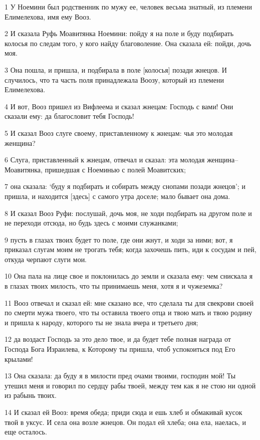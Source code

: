 \par 1 У Ноемини был родственник по мужу ее, человек весьма знатный, из племени Елимелехова, имя ему Вооз.
\par 2 И сказала Руфь Моавитянка Ноемини: пойду я на поле и буду подбирать колосья по следам того, у кого найду благоволение. Она сказала ей: пойди, дочь моя.
\par 3 Она пошла, и пришла, и подбирала в поле [колосья] позади жнецов. И случилось, что та часть поля принадлежала Воозу, который из племени Елимелехова.
\par 4 И вот, Вооз пришел из Вифлеема и сказал жнецам: Господь с вами! Они сказали ему: да благословит тебя Господь!
\par 5 И сказал Вооз слуге своему, приставленному к жнецам: чья это молодая женщина?
\par 6 Слуга, приставленный к жнецам, отвечал и сказал: эта молодая женщина--Моавитянка, пришедшая с Ноеминью с полей Моавитских;
\par 7 она сказала: `буду я подбирать и собирать между снопами позади жнецов'; и пришла, и находится [здесь] с самого утра доселе; мало бывает она дома.
\par 8 И сказал Вооз Руфи: послушай, дочь моя, не ходи подбирать на другом поле и не переходи отсюда, но будь здесь с моими служанками;
\par 9 пусть в глазах твоих будет то поле, где они жнут, и ходи за ними; вот, я приказал слугам моим не трогать тебя; когда захочешь пить, иди к сосудам и пей, откуда черпают слуги мои.
\par 10 Она пала на лице свое и поклонилась до земли и сказала ему: чем снискала я в глазах твоих милость, что ты принимаешь меня, хотя я и чужеземка?
\par 11 Вооз отвечал и сказал ей: мне сказано все, что сделала ты для свекрови своей по смерти мужа твоего, что ты оставила твоего отца и твою мать и твою родину и пришла к народу, которого ты не знала вчера и третьего дня;
\par 12 да воздаст Господь за это дело твое, и да будет тебе полная награда от Господа Бога Израилева, к Которому ты пришла, чтоб успокоиться под Его крылами!
\par 13 Она сказала: да буду я в милости пред очами твоими, господин мой! Ты утешил меня и говорил по сердцу рабы твоей, между тем как я не стою ни одной из рабынь твоих.
\par 14 И сказал ей Вооз: время обеда; приди сюда и ешь хлеб и обмакивай кусок твой в уксус. И села она возле жнецов. Он подал ей хлеба; она ела, наелась, и еще осталось.
